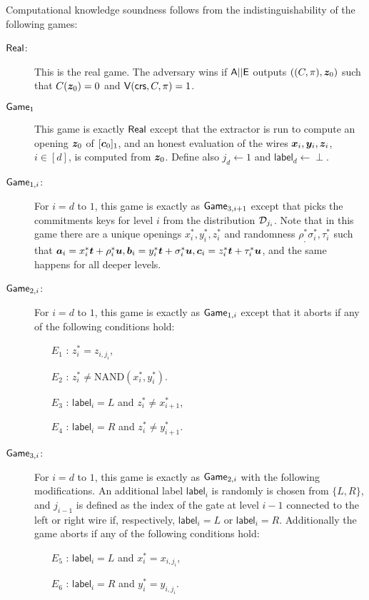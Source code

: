 Computational knowledge soundness follows from the indistinguishability of the following games:
\begin{description}
\item[$\mathsf{Real}$:] This is the real game. The adversary wins if $\mathsf{A}||\mathsf{E}$ outputs $((C,\pi),{\boldsymbol{z}}_0)$ such that $C({\boldsymbol{z}}_0)=0$ and $\mathsf{V}(\mathsf{crs},C,\pi)=1$.
\item[$\mathsf{Game}_{1}$] This game is exactly $\mathsf{Real}$ except that the extractor is run to compute an opening ${\boldsymbol{z}}_0$ of $[{\boldsymbol{c}}_0]_1$, and an honest evaluation of the wires ${\boldsymbol{x}}_i,{\boldsymbol{y}}_i,{\boldsymbol{z}}_i$, $i\in[d]$, is computed from ${\boldsymbol{z}}_0$. Define also $j_d\gets 1$ and $\mathsf{label}_d \gets \perp$.
\item[$\mathsf{Game}_{1,i}$:] For $i=d$ to $1$, this game is exactly as $\mathsf{Game}_{3,i+1}$ except that picks the commitments keys for level $i$ from the distribution $\mathcal{D}_{j_i}$. {\color{red} Note that in this game there are a unique openings $x^*_i,y^*_i,z^*_i$ and randomness $\rho^*_,\sigma^*_i,\tau^*_i$ such that ${\boldsymbol{a}}_i = x^*_i{\boldsymbol{t}}+\rho^*_i{\boldsymbol{u}}, {\boldsymbol{b}}_i = y^*_i{\boldsymbol{t}}+\sigma^*_i{\boldsymbol{u}}, {\boldsymbol{c}}_i = z^*_i{\boldsymbol{t}}+\tau^*_i{\boldsymbol{u}}$, and the same happens for all deeper levels.}

\item[$\mathsf{Game}_{2,i}$:] For $i=d$ to $1$, this game is exactly as $\mathsf{Game}_{1,i}$ except that it  aborts if any of the following conditions hold:
\begin{itemize}
 	\item[$E_1$ :] $z^*_{i}= z_{i,j_i}$,
 	\item[$E_2$ :] $z^*_i\neq \mathrm{NAND}(x^*_i,y^*_i)$.
 	\item[$E_3$ :] $\mathsf{label}_i = L$ and $z^*_i \neq x^*_{i+1}$,
 	\item[$E_4$ :] $\mathsf{label}_i = R$ and $z^*_i \neq y^*_{i+1}$.
\end{itemize}

\item[$\mathsf{Game}_{3,i}$:] For $i=d$ to $1$, this game is exactly as $\mathsf{Game}_{2,i}$ with the following modifications. An additional label $\mathsf{label}_i$ is randomly is chosen from $\{L,R\}$, and $j_{i-1}$ is defined as the index of the gate at level $i-1$ connected to the left or right wire if, respectively, $\mathsf{label}_i = L$ or $\mathsf{label}_i = R$. Additionally the game aborts if any of the following conditions hold:
\begin{itemize}
	\item[$E_5$ :] $\mathsf{label}_i=L$ and $x^*_i = x_{i,j_i}$,
	\item[$E_6$ :] $\mathsf{label}_i=R$ and $y^*_i = y_{i,j_i}$.
\end{itemize}
\end{description}
 
